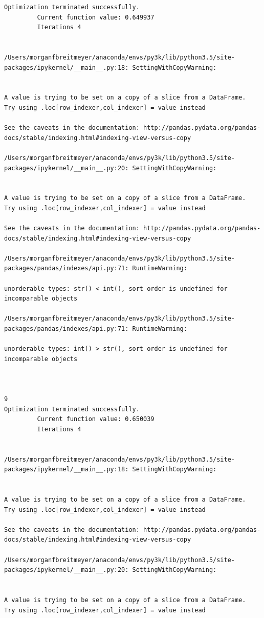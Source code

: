 \begin{lstlisting}
Optimization terminated successfully.
         Current function value: 0.649937
         Iterations 4


/Users/morganfbreitmeyer/anaconda/envs/py3k/lib/python3.5/site-packages/ipykernel/__main__.py:18: SettingWithCopyWarning:


A value is trying to be set on a copy of a slice from a DataFrame.
Try using .loc[row_indexer,col_indexer] = value instead

See the caveats in the documentation: http://pandas.pydata.org/pandas-docs/stable/indexing.html#indexing-view-versus-copy

/Users/morganfbreitmeyer/anaconda/envs/py3k/lib/python3.5/site-packages/ipykernel/__main__.py:20: SettingWithCopyWarning:


A value is trying to be set on a copy of a slice from a DataFrame.
Try using .loc[row_indexer,col_indexer] = value instead

See the caveats in the documentation: http://pandas.pydata.org/pandas-docs/stable/indexing.html#indexing-view-versus-copy

/Users/morganfbreitmeyer/anaconda/envs/py3k/lib/python3.5/site-packages/pandas/indexes/api.py:71: RuntimeWarning:

unorderable types: str() < int(), sort order is undefined for incomparable objects

/Users/morganfbreitmeyer/anaconda/envs/py3k/lib/python3.5/site-packages/pandas/indexes/api.py:71: RuntimeWarning:

unorderable types: int() > str(), sort order is undefined for incomparable objects



9
Optimization terminated successfully.
         Current function value: 0.650039
         Iterations 4


/Users/morganfbreitmeyer/anaconda/envs/py3k/lib/python3.5/site-packages/ipykernel/__main__.py:18: SettingWithCopyWarning:


A value is trying to be set on a copy of a slice from a DataFrame.
Try using .loc[row_indexer,col_indexer] = value instead

See the caveats in the documentation: http://pandas.pydata.org/pandas-docs/stable/indexing.html#indexing-view-versus-copy

/Users/morganfbreitmeyer/anaconda/envs/py3k/lib/python3.5/site-packages/ipykernel/__main__.py:20: SettingWithCopyWarning:


A value is trying to be set on a copy of a slice from a DataFrame.
Try using .loc[row_indexer,col_indexer] = value instead


\end{lstlisting}
